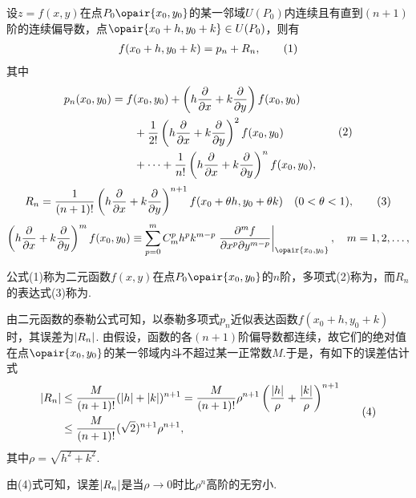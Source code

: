 \begin{theorem}\label{theorem:多元函数微分法.二元函数的泰勒公式}
\def\oprt#1{\left(h\pdv{x}+k\pdv{y}\right)\ifx\relax#1\relax\else^{#1}\fi}
设\(z=f(x,y)\)在点\(P_0\opair{x_0,y_0}\)的某一邻域\(U(P_0)\)内连续且有直到\((n+1)\)阶的连续偏导数，点\(\opair{x_0+h,y_0+k} \in U(P_0)\)，则有
\begin{gather}
f(x_0+h,y_0+k) = p_n + R_n,
\tag1
\end{gather}
其中\begin{gather}
\label{equation:多元函数微分法.二元函数的泰勒多项式}
\begin{split}
p_n(x_0,y_0)
&=f(x_0,y_0)
 + \oprt{} f(x_0,y_0) \\
&\hspace{20pt}+ \frac{1}{2!} \oprt{2} f(x_0,y_0) \\
&\hspace{20pt}+ \dotsb + \frac{1}{n!} \oprt{n} f(x_0,y_0),
\end{split}
\tag2
\end{gather}
\begin{gather}
\label{equation:多元函数微分法.二元函数的泰勒公式的拉格朗日型余项}
R_n = \frac{1}{(n+1)!} \oprt{n+1} f(x_0+\theta h,y_0+\theta k)
\quad (0 < \theta < 1),
\tag3
\end{gather}\[
\oprt{m} f(x_0,y_0)
\equiv
\sum\limits_{p=0}^{m} C_m^p h^p k^{m-p}
 \eval{\frac{\partial^m f}{\partial x^p \partial y^{m-p}}}_{\opair{x_0,y_0}},
\quad m=1,2,\dotsc,
\]

公式(1)称为二元函数\(f(x,y)\)在点\(P_0\opair{x_0,y_0}\)的\(n\)阶，多项式(2)称为，而\(R_n\)的表达式(3)称为.
\end{theorem}
由二元函数的泰勒公式可知，以泰勒多项式\(p_n\)近似表达函数\(f(x_0+h,y_0+k)\)时，其误差为\(\abs{R_n}\).
由假设，函数的各\((n+1)\)阶偏导数都连续，故它们的绝对值在点\(\opair{x_0,y_0}\)的某一邻域内斗不超过某一正常数\(M\).于是，有如下的误差估计式\begin{gather}
\begin{split}
\abs{R_n}
&\leq \frac{M}{(n+1)!} (\abs{h}+\abs{k})^{n+1}
= \frac{M}{(n+1)!} \rho^{n+1} \left( \frac{\abs{h}}{\rho} + \frac{\abs{k}}{\rho} \right)^{n+1} \\
&\leq \frac{M}{(n+1)!} (\sqrt{2})^{n+1} \rho^{n+1},
\end{split}
\tag4
\end{gather}其中\(\rho=\sqrt{h^2+k^2}\).

由(4)式可知，误差\(\abs{R_n}\)是当\(\rho\to0\)时比\(\rho^n\)高阶的无穷小.

